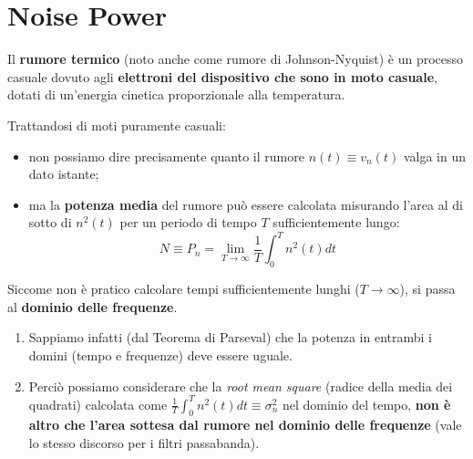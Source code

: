 \documentclass[openany,a4paper,12pt]{book}
\begin{document}
\section*{Noise Power}

Il \textbf{rumore termico} (noto anche come rumore di Johnson-Nyquist) è un processo casuale dovuto agli \textbf{elettroni del dispositivo che sono in moto casuale}, dotati di un'energia cinetica proporzionale alla temperatura.

Trattandosi di moti puramente casuali:
\begin{itemize}[label=\textcolor{PoliBlue}{\textbullet}]
    \item non possiamo dire precisamente quanto il rumore $n(t) \equiv v_n(t)$ valga in un dato istante;
    \item ma la \textbf{potenza media} del rumore può essere calcolata misurando l'area al di sotto di $n^2(t)$ per un periodo di tempo $T$ sufficientemente lungo:
    \begin{equation}
        N \equiv P_n = \lim_{T \to \infty} \frac{1}{T} \int_0^T n^2(t) dt
    \end{equation}
\end{itemize}

Siccome non è pratico calcolare tempi sufficientemente lunghi ($T \to \infty$), si passa al \textbf{dominio delle frequenze}.
\begin{enumerate}
    \item Sappiamo infatti (dal Teorema di Parseval) che la potenza in entrambi i domini (tempo e frequenze) deve essere uguale.
    \item Perciò possiamo considerare che la \textit{root mean square} (radice della media dei quadrati) calcolata come $\frac{1}{T}\int_0^T n^2(t) dt \equiv \sigma_n^2$ nel dominio del tempo, \textbf{non è altro che l'area sottesa dal rumore nel dominio delle frequenze} (vale lo stesso discorso per i filtri passabanda).
\end{enumerate}
\end{document}
